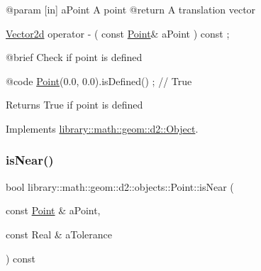 \begin{DoxyCode}
    @param              [in] aPoint A point
    @\textcolor{keywordflow}{return}             A translation vector

\hyperlink{namespacelibrary_1_1math_1_1obj_a2fa27512c4f4b07db35d602cfdd2c293}{Vector2d}                operator -                                  (   \textcolor{keyword}{const}   
      \hyperlink{classlibrary_1_1math_1_1geom_1_1d2_1_1objects_1_1_point_a4998aefdf80bdfd967f21d49fa050398}{Point}&                      aPoint                                      ) \textcolor{keyword}{const} ;

    @brief              Check \textcolor{keywordflow}{if} point is defined
   
    @code
                        \hyperlink{classlibrary_1_1math_1_1geom_1_1d2_1_1objects_1_1_point_a4998aefdf80bdfd967f21d49fa050398}{Point}(0.0, 0.0).isDefined() ; \textcolor{comment}{// True}
\end{DoxyCode}


\begin{DoxyReturn}{Returns}
True if point is defined 
\end{DoxyReturn}


Implements \hyperlink{classlibrary_1_1math_1_1geom_1_1d2_1_1_object_ae9506254971168a3ca63e1923556b70d}{library\+::math\+::geom\+::d2\+::\+Object}.

\mbox{\label{classlibrary_1_1math_1_1geom_1_1d2_1_1objects_1_1_point_aeec1bab241792dc6b6091d9cac36d02e}} 
\subsubsection{\texorpdfstring{is\+Near()}{isNear()}}
{\footnotesize\ttfamily bool library\+::math\+::geom\+::d2\+::objects\+::\+Point\+::is\+Near (\begin{DoxyParamCaption}\item[{const \hyperlink{classlibrary_1_1math_1_1geom_1_1d2_1_1objects_1_1_point}{Point} \&}]{a\+Point,  }\item[{const Real \&}]{a\+Tolerance }\end{DoxyParamCaption}) const}



